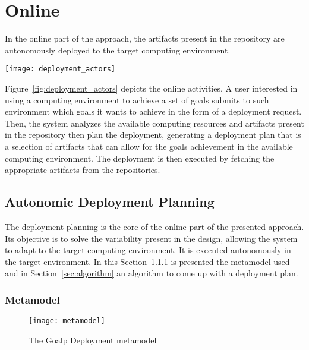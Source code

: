 \section{Online}
\label{sec:online}

In the online part of the approach, the artifacts present in the repository are autonomously deployed to the target computing environment.

\begin{figure*}[!htb]
  \centering
  \texttt{[image: deployment\_actors]}
  \caption{Goald Autonomic Deployment}
\label{fig:deployment_actors}
\end{figure*}

Figure~\ref{fig:deployment_actors} depicts the online activities. A user interested in using a computing environment to achieve a set of goals submits to such environment which goals it wants to achieve in the form of a deployment request. Then, the system analyzes the available computing resources and artifacts present in the repository then plan the deployment, generating a deployment plan that is a selection of artifacts that can allow for the goals achievement in the available computing environment. The deployment is then executed by fetching the appropriate artifacts from the repositories.

\subsection{Autonomic Deployment Planning}
\label{sec:planning}

The deployment planning is the core of the online part of the presented approach. Its objective is to solve the variability present in the design, allowing the system to adapt to the target computing environment. It is executed autonomously in the target environment. In this Section~\ref{sec:metamodel} is presented the metamodel used and in Section~\ref{sec:algorithm} an algorithm to come up with a deployment plan.

\subsubsection{Metamodel}
\label{sec:metamodel}

\begin{figure}[!htb]
  \centering
  \texttt{[image: metamodel]}
  \caption{The Goalp Deployment metamodel}
  \label{fig:metamodel}
\end{figure}

